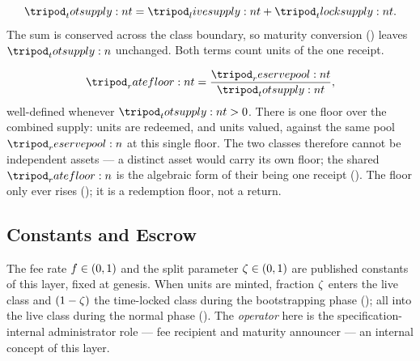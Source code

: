 \documentclass[../main.tex]{subfiles}
\begin{document}
\begin{definition}[Supply]
    \label{def:model:supply}
    \[
        \totsupply{t} = \livesupply{t} + \tlocksupply{t}.
    \]
    The sum is conserved across the class boundary, so maturity conversion
    () leaves $\totsupply{}$ unchanged. Both terms count
    units of the one receipt.
\end{definition}

\begin{definition}
    \label{def:model:ratefloor}
    \[
        \ratefloor{t} = \frac{\reservepool{t}}{\totsupply{t}},
    \]
    well-defined whenever $\totsupply{t} > 0$. There is one floor over the combined supply:
    \liveclass{} units are redeemed, and \tlockclass{} units valued, against the same pool
    $\reservepool{}$ at this single floor. The two classes therefore cannot be independent
    assets --- a distinct asset would carry its own floor; the shared $\ratefloor{}$ is the
    algebraic form of their being one receipt (). The floor only
    ever rises (); it is a redemption floor, not a
    return.
\end{definition}

\subsection{Constants and Escrow}
\label{sec:model:constants}

\begin{definition}
    \label{def:model:fee-and-split}
    The fee rate $f \in (0,1)$ and the split parameter $\zeta \in (0,1)$ are
    published constants of this layer, fixed at genesis. When units are minted, fraction
    $\zeta$ enters the live class and $(1-\zeta)$ the time-locked class during
    the bootstrapping phase (); all into the live class
    during the normal phase (). The \emph{operator} here is
    the specification-internal administrator role --- fee recipient and maturity announcer --- an internal
    concept of this layer.
\end{definition}
\end{document}
